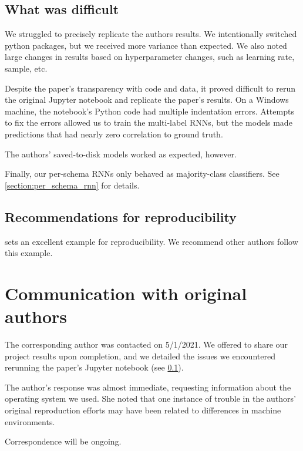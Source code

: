 \documentclass[11pt,a4paper]{article}
\begin{document}
\subsection{What was difficult}
\label{section:what_was_difficult}
We struggled to precisely replicate the authors results. We intentionally switched python packages, but we received more variance than expected. We also noted large changes in results based on hyperparameter changes, such as learning rate, sample, etc. 

Despite the paper's transparency with code and data, it proved difficult to rerun the original Jupyter notebook and replicate the paper's results. On a Windows machine, the notebook's Python code had multiple indentation errors. Attempts to fix the errors allowed us to train the multi-label RNNs, but the models made predictions that had nearly zero correlation to ground truth.

The authors' saved-to-disk models worked as expected, however.

Finally, our per-schema RNNs only behaved as majority-class classifiers. See \ref{section:per_schema_rnn} for details.

\subsection{Recommendations for reproducibility}
\citeauthor{burger_2021} sets an excellent example for reproducibility. We recommend other authors follow this example.

\section{Communication with original authors}
The corresponding author was contacted on 5/1/2021. We offered to share our project results upon completion, and we detailed the issues we encountered rerunning the paper's Jupyter notebook (see \ref{section:what_was_difficult}).

The author's response was almost immediate, requesting information about the operating system we used. She noted that one instance of trouble in the authors' original reproduction efforts may have been related to differences in machine environments.

Correspondence will be ongoing.




\end{document}
